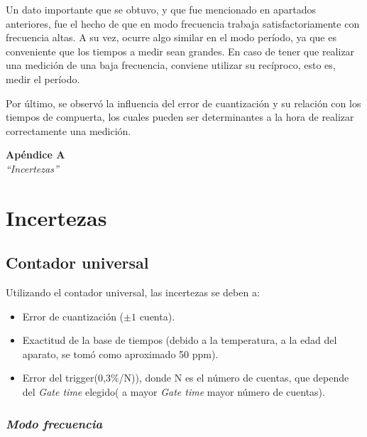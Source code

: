 \documentclass{article}
\begin{document}
	Un dato importante que se obtuvo, y que fue mencionado en apartados anteriores, fue el hecho de que en modo frecuencia trabaja satisfactoriamente con frecuencia altas. A su vez, ocurre algo similar en el modo período, ya que es conveniente que los tiempos a medir sean grandes. En caso de tener que realizar una medición de una baja frecuencia, conviene utilizar su recíproco, esto es, medir el período.
	\par
	Por último, se observó la influencia del error de cuantización y su relación con los tiempos de compuerta, los cuales pueden ser determinantes a la hora de realizar correctamente una medición.


	


\newpage \textit{}
\newpage



\newpage
\vspace*{4cm}
\begin{center}
	\textbf{\Huge{Apéndice A}} \\
	\bigskip\bigskip
	\Large{\textit{``Incertezas''}}
\end{center}


\newpage \textit{}

\section{Incertezas}

\subsection{\textbf{Contador universal}} Utilizando el contador universal, las incertezas se deben a:
\smallskip

\begin{itemize}
	\itemsep=3pt \topsep=0pt \partopsep=0pt \parskip=0pt \parsep=0pt

	\item{Error de cuantización ($\pm 1$ cuenta).}
	\item{Exactitud de la base de tiempos (debido a la temperatura, a la edad del aparato, se tomó como aproximado 50 ppm).}
	\item{Error del trigger(0,3\%/N)), donde N es el número de cuentas, que depende del \textit{Gate time} elegido( a mayor \textit{Gate time} mayor número de cuentas)}.
\end{itemize}

\medskip

\subsubsection{\textit{Modo frecuencia}}
\end{document}

